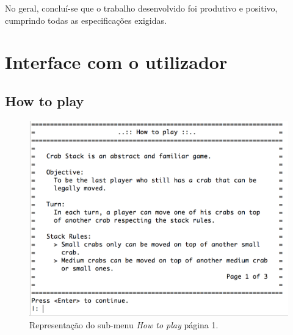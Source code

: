 \documentclass[a4paper]{article}
\begin{document}
No geral, concluí-se que o trabalho desenvolvido foi produtivo e positivo, cumprindo todas as especificações exigidas.


\clearpage
{}
\renewcommand\refname{Bibliografia}



\newpage
\appendix
\section{Interface com o utilizador} \label{app:interface}

\subsection{How to play}

\begin{figure}[!ht]
	\begin{center}
	\includegraphics[scale=0.4]{img/how_to_play_1.png}
	\caption{Representação do sub-menu \textit{How to play} página 1.}
    \label{Fig:how_to_play_1}
	\end{center}
\end{figure}
\end{document}
